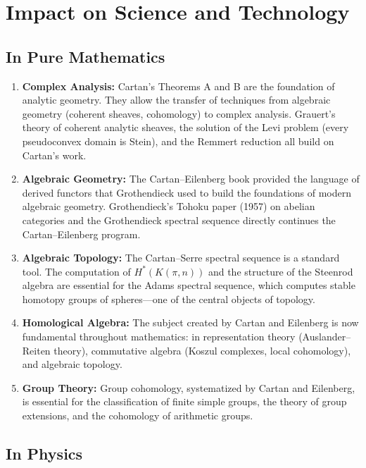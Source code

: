 \section{Impact on Science and Technology}

\subsection{In Pure Mathematics}

\begin{enumerate}
    \item \textbf{Complex Analysis:} Cartan's Theorems A and B are the foundation of analytic geometry. They allow the transfer of techniques from algebraic geometry (coherent sheaves, cohomology) to complex analysis. Grauert's theory of coherent analytic sheaves, the solution of the Levi problem (every pseudoconvex domain is Stein), and the Remmert reduction all build on Cartan's work.
    
    \item \textbf{Algebraic Geometry:} The Cartan--Eilenberg book provided the language of derived functors that Grothendieck used to build the foundations of modern algebraic geometry. Grothendieck's Tohoku paper (1957) on abelian categories and the Grothendieck spectral sequence directly continues the Cartan--Eilenberg program.
    
    \item \textbf{Algebraic Topology:} The Cartan--Serre spectral sequence is a standard tool. The computation of $H^*(K(\pi, n))$ and the structure of the Steenrod algebra are essential for the Adams spectral sequence, which computes stable homotopy groups of spheres---one of the central objects of topology.
    
    \item \textbf{Homological Algebra:} The subject created by Cartan and Eilenberg is now fundamental throughout mathematics: in representation theory (Auslander--Reiten theory), commutative algebra (Koszul complexes, local cohomology), and algebraic topology.
    
    \item \textbf{Group Theory:} Group cohomology, systematized by Cartan and Eilenberg, is essential for the classification of finite simple groups, the theory of group extensions, and the cohomology of arithmetic groups.
\end{enumerate}

\subsection{In Physics}

